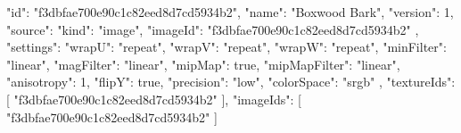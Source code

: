 {
  "id": "f3dbfae700e90c1c82eed8d7cd5934b2",
  "name": "Boxwood Bark",
  "version": 1,
  "source": {
    "kind": "image",
    "imageId": "f3dbfae700e90c1c82eed8d7cd5934b2"
  },
  "settings": {
    "wrapU": "repeat",
    "wrapV": "repeat",
    "wrapW": "repeat",
    "minFilter": "linear",
    "magFilter": "linear",
    "mipMap": true,
    "mipMapFilter": "linear",
    "anisotropy": 1,
    "flipY": true,
    "precision": "low",
    "colorSpace": "srgb"
  },
  "textureIds": [
    "f3dbfae700e90c1c82eed8d7cd5934b2"
  ],
  "imageIds": [
    "f3dbfae700e90c1c82eed8d7cd5934b2"
  ]
}

